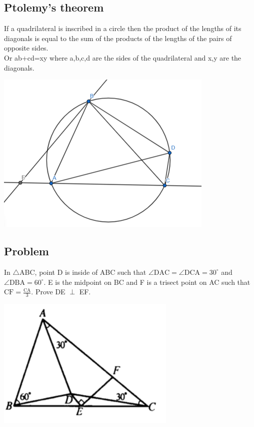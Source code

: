 \documentclass{article}
\begin{document}
\pagebreak

\subsection{Ptolemy's theorem}

If a quadrilateral is inscribed in a circle then the product of the lengths of its diagonals is equal to the sum of the products of the lengths of the pairs of opposite sides.
\\Or ab+cd=xy where a,b,c,d are the sides of the quadrilateral and x,y are the diagonals.

\includegraphics{Picture20.png}

\pagebreak

\subsection{Problem}
In \(\triangle\)ABC, point D is inside of ABC such that \(\angle \mathrm{DAC} = \angle \mathrm{DCA}=30^{\circ} \) and \(\angle \mathrm{DBA}=60^{\circ}\). E is the midpoint on BC and F is a trisect point on AC such that \(\mathrm{CF} = \frac{\mathrm{CA}}{3} \). Prove DE \(\perp\) EF.

\includegraphics{Picture21.png}
\end{document}
